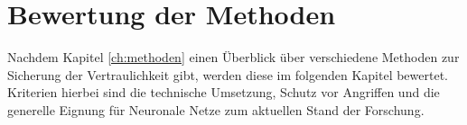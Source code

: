 \chapter{Bewertung der Methoden}

Nachdem Kapitel \ref{ch:methoden} einen Überblick über verschiedene Methoden zur Sicherung der Vertraulichkeit gibt, werden diese im folgenden Kapitel bewertet.
Kriterien hierbei sind die technische Umsetzung, Schutz vor Angriffen und die generelle Eignung für Neuronale Netze zum aktuellen Stand der Forschung.






